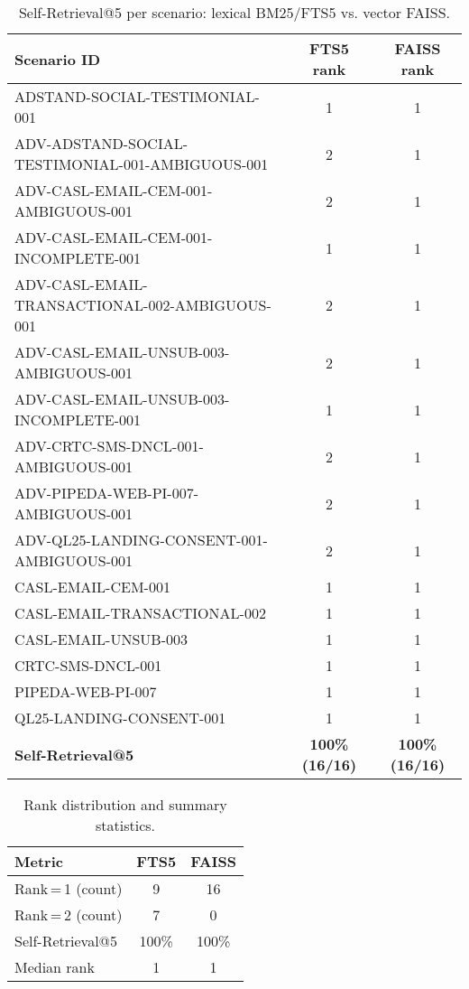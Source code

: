 \begin{table}[t]
\centering
\caption{Self-Retrieval@5 per scenario: lexical BM25/FTS5 vs. vector FAISS.}
\label{tab:self-retrieval-per-scenario}
\scriptsize
\begin{tabular}{@{}lcc@{}}
\toprule
\textbf{Scenario ID} & \textbf{FTS5 rank} & \textbf{FAISS rank} \\
\midrule
ADSTAND-SOCIAL-TESTIMONIAL-001 & 1 & 1 \\
ADV-ADSTAND-SOCIAL-TESTIMONIAL-001-AMBIGUOUS-001 & 2 & 1 \\
ADV-CASL-EMAIL-CEM-001-AMBIGUOUS-001 & 2 & 1 \\
ADV-CASL-EMAIL-CEM-001-INCOMPLETE-001 & 1 & 1 \\
ADV-CASL-EMAIL-TRANSACTIONAL-002-AMBIGUOUS-001 & 2 & 1 \\
ADV-CASL-EMAIL-UNSUB-003-AMBIGUOUS-001 & 2 & 1 \\
ADV-CASL-EMAIL-UNSUB-003-INCOMPLETE-001 & 1 & 1 \\
ADV-CRTC-SMS-DNCL-001-AMBIGUOUS-001 & 2 & 1 \\
ADV-PIPEDA-WEB-PI-007-AMBIGUOUS-001 & 2 & 1 \\
ADV-QL25-LANDING-CONSENT-001-AMBIGUOUS-001 & 2 & 1 \\
CASL-EMAIL-CEM-001 & 1 & 1 \\
CASL-EMAIL-TRANSACTIONAL-002 & 1 & 1 \\
CASL-EMAIL-UNSUB-003 & 1 & 1 \\
CRTC-SMS-DNCL-001 & 1 & 1 \\
PIPEDA-WEB-PI-007 & 1 & 1 \\
QL25-LANDING-CONSENT-001 & 1 & 1 \\
\midrule
\textbf{Self-Retrieval@5} & \textbf{100\% (16/16)} & \textbf{100\% (16/16)} \\
\bottomrule
\end{tabular}
\end{table}

\begin{table}[t]
\centering
\caption{Rank distribution and summary statistics.}
\label{tab:self-retrieval-summary}
\begin{tabular}{@{}lcc@{}}
\toprule
\textbf{Metric} & \textbf{FTS5} & \textbf{FAISS} \\
\midrule
Rank\,=\,1 (count) & 9 & 16 \\
Rank\,=\,2 (count) & 7 & 0 \\
Self-Retrieval@5 & 100\% & 100\% \\
Median rank & 1 & 1 \\
\bottomrule
\end{tabular}
\end{table}
